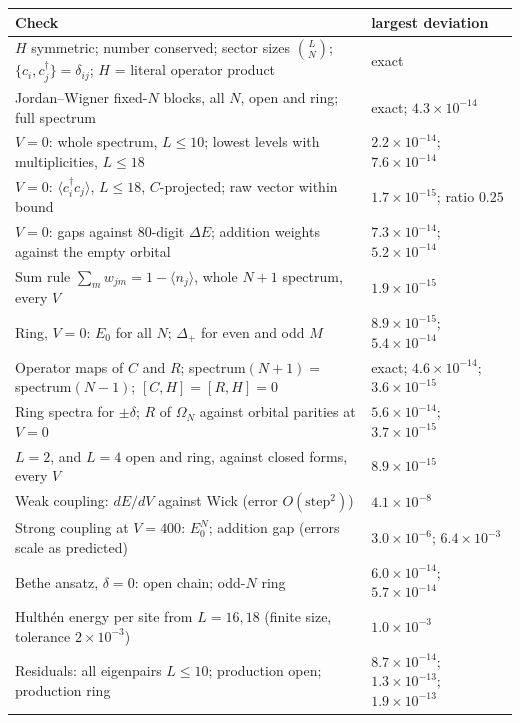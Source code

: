 \documentclass[11pt,a4paper]{article}
\newcommand{\dg}{^{\dagger}}
\begin{document}
\begin{table}[t]
  \centering
  \footnotesize
  \begin{tabular}{p{10.2cm}l}
    \toprule
    Check & largest deviation \\
    \midrule
    $H$ symmetric; number conserved; sector sizes $\binom{L}{N}$; $\{c_i,c_j\dg\}=\delta_{ij}$; $H$ = literal operator product & exact \\
    Jordan--Wigner fixed-$N$ blocks, all $N$, open and ring; full spectrum & exact; $4.3\times10^{-14}$ \\
    $V=0$: whole spectrum, $L\le10$; lowest levels with multiplicities, $L\le18$ & $2.2\times10^{-14}$; $7.6\times10^{-14}$ \\
    $V=0$: $\langle c_i\dg c_j\rangle$, $L\le18$, $C$-projected; raw vector within bound & $1.7\times10^{-15}$; ratio $0.25$ \\
    $V=0$: gaps against 80-digit $\Delta E$; addition weights against the empty orbital & $7.3\times10^{-14}$; $5.2\times10^{-14}$ \\
    Sum rule $\sum_mw_{jm}=1-\langle n_j\rangle$, whole $N+1$ spectrum, every $V$ & $1.9\times10^{-15}$ \\
    Ring, $V=0$: $E_0$ for all $N$; $\Delta_+$ for even and odd $M$ & $8.9\times10^{-15}$; $5.4\times10^{-14}$ \\
    Operator maps of $C$ and $R$; spectrum$(N+1)=$ spectrum$(N-1)$; $[C,H]=[R,H]=0$ & exact; $4.6\times10^{-14}$; $3.6\times10^{-15}$ \\
    Ring spectra for $\pm\delta$; $R$ of $\Omega_N$ against orbital parities at $V=0$ & $5.6\times10^{-14}$; $3.7\times10^{-15}$ \\
    $L=2$, and $L=4$ open and ring, against closed forms, every $V$ & $8.9\times10^{-15}$ \\
    Weak coupling: $dE/dV$ against Wick (error $O(\text{step}^2)$) & $4.1\times10^{-8}$ \\
    Strong coupling at $V=400$: $E_0^N$; addition gap (errors scale as predicted) & $3.0\times10^{-6}$; $6.4\times10^{-3}$ \\
    Bethe ansatz, $\delta=0$: open chain; odd-$N$ ring & $6.0\times10^{-14}$; $5.7\times10^{-14}$ \\
    Hulth\'en energy per site from $L=16,18$ (finite size, tolerance $2\times10^{-3}$) & $1.0\times10^{-3}$ \\
    Residuals: all eigenpairs $L\le10$; production open; production ring & $8.7\times10^{-14}$; $1.3\times10^{-13}$; $1.9\times10^{-13}$ \\

\end{tabular}
\end{table}
\end{document}
